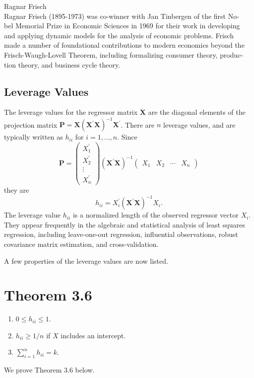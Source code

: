 \documentclass[10pt]{article}
\begin{document}
Ragnar Frisch\\
Ragnar Frisch (1895-1973) was co-winner with Jan Tinbergen of the first No-\\
bel Memorial Prize in Economic Sciences in 1969 for their work in developing\\
and applying dynamic models for the analysis of economic problems. Frisch\\
made a number of foundational contributions to modern economics beyond the\\
Frisch-Waugh-Lovell Theorem, including formalizing consumer theory, produc-\\
tion theory, and business cycle theory.

\subsection{Leverage Values}
The leverage values for the regressor matrix $\boldsymbol{X}$ are the diagonal elements of the projection matrix $\boldsymbol{P}=\boldsymbol{X}\left(\boldsymbol{X}^{\prime} \boldsymbol{X}\right)^{-1} \boldsymbol{X}^{\prime}$. There are $n$ leverage values, and are typically written as $h_{i i}$ for $i=1, \ldots, n$. Since
$$
\boldsymbol{P}=\left(\begin{array}{c}
X_{1}^{\prime} \\
X_{2}^{\prime} \\
\vdots \\
X_{n}^{\prime}
\end{array}\right)\left(\boldsymbol{X}^{\prime} \boldsymbol{X}\right)^{-1}\left(\begin{array}{llll}
X_{1} & X_{2} & \cdots & X_{n}
\end{array}\right)
$$
they are
$$
h_{i i}=X_{i}^{\prime}\left(\boldsymbol{X}^{\prime} \boldsymbol{X}\right)^{-1} X_{i} .
$$
The leverage value $h_{i i}$ is a normalized length of the observed regressor vector $X_{i}$. They appear frequently in the algebraic and statistical analysis of least squares regression, including leave-one-out regression, influential observations, robust covariance matrix estimation, and cross-validation.

A few properties of the leverage values are now listed.

\section{Theorem 3.6}
\begin{enumerate}
  \item $0 \leq h_{i i} \leq 1$.

  \item $h_{i i} \geq 1 / n$ if $X$ includes an intercept.

  \item $\sum_{i=1}^{n} h_{i i}=k$.

\end{enumerate}
We prove Theorem $3.6$ below.
\end{document}
